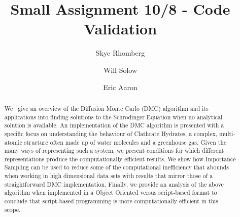 \documentclass[journal=jacsat,manuscript=article]{achemso}
\author{Skye Rhomberg}
\author{Will Solow}
\author{Eric Aaron}
\affiliation[Colby College]
{Department of Computer Science, Colby College, Waterville, ME}
\title[An \textsf{achemso} demo]
  {Small Assignment 10/8 - Code Validation}
\begin{document}
%
%
%
%
%

\begin{abstract}
We~\cite{Anderson1975} give an overview of the Diffusion Monte Carlo (DMC) algorithm and its applications into finding solutions to the Schrodinger Equation when no analytical solution is available. An implementation of the DMC algorithm is presented with a specific focus on understanding the behaviour of Clathrate Hydrates, a complex, multi-atomic structure often made up of water molecules and a greenhouse gas. Given the many ways of representing such a system, we present conditions for which different representations produce the computationally efficient results. We show how Importance Sampling can be used to reduce some of the computational inefficiency that abounds when working in high dimensional data sets with results that mirror those of a straightforward DMC implementation. Finally, we provide an analysis of the above algorithm when implemented in a Object Oriented versus script-based format to conclude that script-based programming is more computationally efficient in this scope.
\end{abstract}
\end{document}
